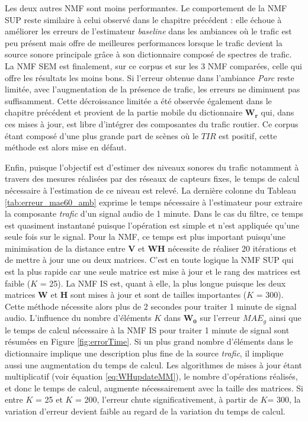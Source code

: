 Les deux autres NMF sont moins performantes.
Le comportement de la NMF SUP reste similaire à celui observé dans le chapitre précédent : elle échoue à améliorer les erreurs de l'estimateur \textit{baseline} dans les ambiances où le trafic est peu présent mais offre de meilleures performances lorsque le trafic devient la source sonore principale grâce à son dictionnaire composé de spectres de trafic.
La NMF SEM est finalement, sur ce corpus et sur les 3 NMF comparées, celle qui offre les résultats les moins bons. Si l'erreur obtenue dans l'ambiance \textit{Parc} reste limitée, avec l'augmentation de la présence de trafic, les erreurs ne diminuent pas suffisamment. Cette décroissance limitée a été observée également dans le chapitre précédent et provient de la partie mobile du dictionnaire $\mathbf{W_r}$ qui, dans ces mises à jour, est libre d'intégrer des composantes du trafic routier. Ce corpus étant composé d'une plus grande part de scènes où le $TIR$ est positif, cette méthode est alors mise en défaut. 

Enfin, puisque l'objectif est d'estimer des niveaux sonores du trafic notamment à travers des mesures réalisées par des réseaux de capteurs fixes, le temps de calcul nécessaire à l'estimation de ce niveau est relevé. La dernière colonne du Tableau \ref{tab:erreur_mae60_amb} exprime le temps nécessaire à l'estimateur pour extraire la composante \textit{trafic} d'un signal audio de 1 minute. Dans le cas du filtre, ce temps est quasiment instantané puisque l'opération est simple et n'est appliquée qu'une seule fois sur le signal.
Pour la NMF, ce temps est plus important puisqu'une minimisation de la distance entre $\mathbf{V}$ et $\mathbf{WH}$ nécessite de réaliser 20  itérations et de mettre à jour une ou deux matrices. C'est en toute logique la NMF SUP qui est la plus rapide car une seule matrice est mise à jour et le rang des matrices est faible ($K$ = 25).
La NMF IS est, quant à elle, la plus longue puisque les deux matrices $\mathbf{W}$ et $\mathbf{H}$ sont mises à jour et sont de tailles importantes ($K$ = 300). Cette méthode nécessite alors plus de 2 secondes pour traiter 1 minute de signal audio. L'influence du nombre d'éléments $K$ dans $\mathbf{W_0}$ sur l'erreur $MAE_g$ ainsi que le temps de calcul nécessaire à la NMF IS pour traiter 1 minute de signal sont résumées en Figure \ref{fig:errorTime}. Si un plus grand nombre d'éléments dans le dictionnaire implique une description plus fine de la source \textit{trafic}, il implique aussi une augmentation du temps de calcul. Les algorithmes de mises à jour étant multiplicatif (voir équation \ref{eq:WHupdateMM}), le nombre d'opérations réalisés, et donc le temps de calcul, augmente nécessairement avec la taille des matrices. Si entre $K$ = 25 et $K$ = 200, l'erreur chute significativement, à partir de $K$= 300, la variation d'erreur devient faible au regard de la variation du temps de calcul. 

